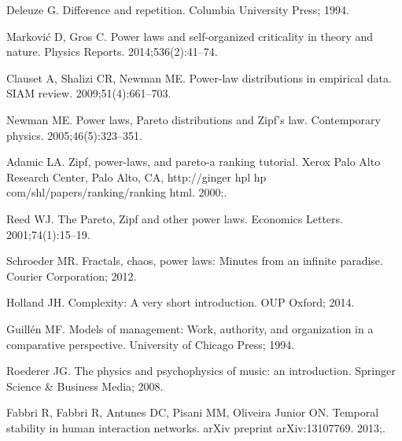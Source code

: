 \documentclass[10pt,letterpaper]{article}
\begin{document}
\begin{thebibliography}{10}
Deleuze G.
\newblock Difference and repetition.
\newblock Columbia University Press; 1994.

Markovi{\'c} D, Gros C.
\newblock Power laws and self-organized criticality in theory and nature.
\newblock Physics Reports. 2014;536(2):41--74.

Clauset A, Shalizi CR, Newman ME.
\newblock Power-law distributions in empirical data.
\newblock SIAM review. 2009;51(4):661--703.

Newman ME.
\newblock Power laws, Pareto distributions and Zipf's law.
\newblock Contemporary physics. 2005;46(5):323--351.

Adamic LA.
\newblock Zipf, power-laws, and pareto-a ranking tutorial.
\newblock Xerox Palo Alto Research Center, Palo Alto, CA, http://ginger hpl hp
  com/shl/papers/ranking/ranking html. 2000;.

Reed WJ.
\newblock The Pareto, Zipf and other power laws.
\newblock Economics Letters. 2001;74(1):15--19.

Schroeder MR.
\newblock Fractals, chaos, power laws: Minutes from an infinite paradise.
\newblock Courier Corporation; 2012.

Holland JH.
\newblock Complexity: A very short introduction.
\newblock OUP Oxford; 2014.

Guill{\'e}n MF.
\newblock Models of management: Work, authority, and organization in a
  comparative perspective.
\newblock University of Chicago Press; 1994.

Roederer JG.
\newblock The physics and psychophysics of music: an introduction.
\newblock Springer Science \& Business Media; 2008.

Fabbri R, Fabbri R, Antunes DC, Pisani MM, Oliveira Junior ON.
\newblock Temporal stability in human interaction networks.
\newblock arXiv preprint arXiv:13107769. 2013;.

% 
% 
% 
% 
\end{thebibliography}
\end{document}
